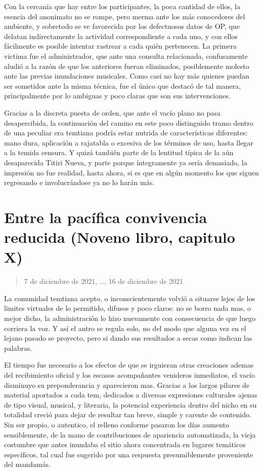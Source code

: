\documentclass[
]{book}
\begin{document}
Con la cercanía que hay entre los participantes, la poca cantidad de ellos, la esencia del anonimato no se rompe, pero merma ante los más conocedores del ambiente, y sobretodo se ve favorecida por los defectuosos datos de OP, que delatan indirectamente la actividad correspondiente a cada uno, y con ellos fácilmente es posible intentar rastrear a cada quién pertenecen. La primera victima fue el administrador, que ante una consulta relacionada, confusamente aludió a la razón de que los anteriores fueran eliminados, posiblemente molesto ante las previas inundaciones musicales. Como casi no hay más quienes puedan ser sometidos ante la misma técnica, fue el único que destacó de tal manera, principalmente por lo ambiguas y poco claras que son sus intervenciones.

Gracias a la discreta puesta de orden, que ante el vacío plano no pasa desapercibida, la continuación del camino en este poco distinguido tramo dentro de una peculiar era temtiana podría estar nutrida de características diferentes: mano dura, aplicación a rajatabla o excesiva de los términos de uso, hasta llegar a la temida censura. Y quizá también parte de la lentitud típica de la aún desaparecida Titiri Nueva, y parte porque íntegramente ya sería demasiado, la impresión no fue realidad, hasta ahora, si es que en algún momento los que siguen regresando e involucrándose ya no lo harán más.

\hypertarget{entre-la-pacuxedfica-convivencia-reducida-noveno-libro-capitulo-x}{%
\section{Entre la pacífica convivencia reducida (Noveno libro, capitulo X)}\label{entre-la-pacuxedfica-convivencia-reducida-noveno-libro-capitulo-x}}

\begin{quote}
7 de diciembre de 2021, \ldots, 16 de diciembre de 2021
\end{quote}

La comunidad temtiana acepto, o inconscientemente volvió a situarse lejos de los limites virtuales de lo permitido, difusos y poco claros: no se borro nada mas, o mejor dicho, la administración lo hizo nuevamente con consecuencia de que luego corriera la voz. Y así el antro se regula solo, no del modo que alguna vez en el lejano pasado se proyecto, pero si dando sus resultados a secas como indican las palabras.

El tiempo fue necesario a los efectos de que se irguieran otras creaciones ademas del recibimiento oficial y los escasos acompañantes venideros inmediatos, el vacío disminuyo su preponderancia y aparecieron mas. Gracias a los largos pilares de material aportados a cada tem, dedicados a diversas expresiones culturales ajenas de tipo visual, musical, y literaria, la potencial experiencia dentro del nicho en su totalidad creció para dejar de resultar tan breve, simple y carente de contenido. Sin ser propio, o autentico, el relleno conforme pasaron los días aumento sensiblemente, de la mano de contribuciones de apariencia automatizada, la vieja costumbre que antes inundaba el sitio ahora concentrada en lugares temáticos específicos, tal cual fue sugerido por una respuesta presumiblemente proveniente del mandamás.
\end{document}
